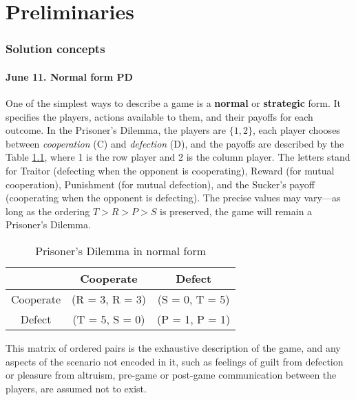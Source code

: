 \chapter{Preliminaries}

\subsection{Solution concepts}

\subsubsection{June 11. Normal form PD}

One of the simplest ways to describe a game is a \textbf{normal} or \textbf{strategic} form. It specifies the players, actions available to them, and their payoffs for each outcome. In the Prisoner's Dilemma, the players are $\{1, 2\}$, each player chooses between \textit{cooperation} (C) and \textit{defection} (D), and the payoffs are described by the Table \ref{table:normalFormPD}, where 1 is the row player and 2 is the column player. The letters stand for Traitor (defecting when the opponent is cooperating), Reward (for mutual cooperation), Punishment (for mutual defection), and the Sucker's payoff (cooperating when the opponent is defecting). The precise values may vary---as long as the ordering $T > R > P > S$ is preserved, the game will remain a Prisoner's Dilemma.

\begin{table}[h]
	\begin{center}
		\begin{tabular}{ | c | c | c | }
	    		\hline
	    		& Cooperate & Defect \\[2ex]
	    		\hline
	    		Cooperate & (R = 3, R = 3) & (S = 0, T = 5) \\[2.5ex] \hline
	    		Defect & (T = 5, S = 0) & (P = 1, P = 1)  \\[2.5ex] \hline
	  	\end{tabular}
		\caption{Prisoner's Dilemma in normal form}
		\label{table:normalFormPD}
	\end{center}
\end{table}

This matrix of ordered pairs is the exhaustive description of the game, and any aspects of the scenario not encoded in it, such as feelings of guilt from defection or pleasure from altruism, pre-game or post-game communication between the players, are assumed not to exist.

